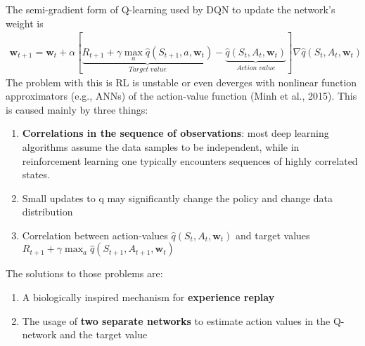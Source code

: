 The semi-gradient form of Q-learning used by DQN to update the network’s weight is
\begin{align}
    \mathbf{w}_{t+1}=\mathbf{w}_t+\alpha[\underbrace{R_{t+1}+\gamma\max_a\hat{q}(S_{t+1}, a, \mathbf{w}_t)}_{Target\;value}-\underbrace{\hat{q}(S_t, A_t, \mathbf{w}_t)}_{Action\;value}]\nabla \hat{q}(S_t, A_t, \mathbf{w}_t)
\end{align}
The problem with this is RL is unstable or even deverges with nonlinear function approximators (e.g., ANNs) of the action-value function (Minh et al., 2015).
This is caused mainly by three things:
\begin{enumerate}
    \item \textbf{Correlations in the sequence of observations}: most deep learning algorithms assume the data samples to be independent, while in reinforcement learning one typically encounters sequences of highly correlated states. 
    \item Small updates to q may significantly change the policy and change data distribution
    \item Correlation between action-values $\hat{q}(S_t, A_t, \mathbf{w}_t)$ and target values $R_{t+1}+\gamma\max_a\hat{q}(S_{t+1}, A_{t+1}, \mathbf{w}_t)$
\end{enumerate}
The solutions to those problems are:
\begin{enumerate}
    \item A biologically inspired mechanism for \textbf{experience replay}
    \item The usage of \textbf{two separate networks} to estimate action values in the Q-network and the target value
\end{enumerate}
